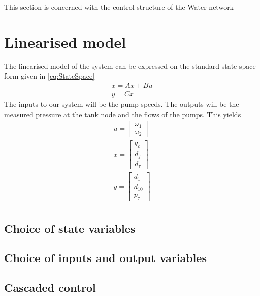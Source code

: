 This section is concerned with the control structure of the Water network

\section{Linearised model}
The linearised model of the system can be expressed on the standard state space form given in \cref{eq:StateSpace}
\begin{equation}\label{eq:StateSpace}
	\begin{split}
	\dot{x} = Ax + Bu \\
	y = Cx
	\end{split}
\end{equation}
The inputs to our system will be the pump speeds. 
The outputs will be the measured pressure at the tank node and the flows of the pumps. This yields
\begin{equation}\label{eq:StateSpaceInputsOutputs}
	\begin{split}
		u = \begin{bmatrix} \omega_1 \\ \omega_2	\end{bmatrix} \\
		x = \begin{bmatrix} q_c \\ d_f \\ d_{\tau}	\end{bmatrix} \\
		y = \begin{bmatrix} d_1 \\ d_{10} \\ p_{\tau}	\end{bmatrix} \\
	\end{split}
\end{equation}





\subsection{Choice of state variables}

\subsection{Choice of inputs and output variables}

\subsection{Cascaded control}

